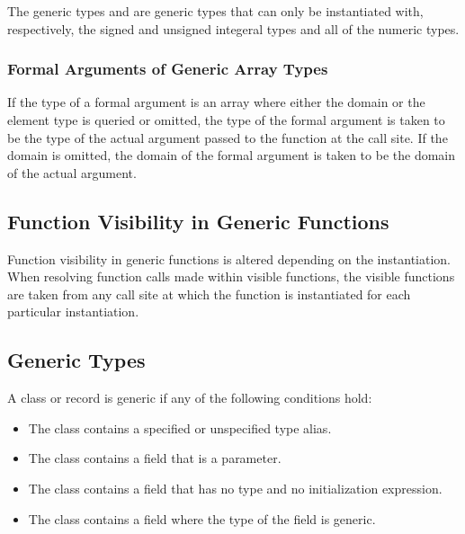 The generic types  and  are generic types
that can only be instantiated with, respectively, the signed and
unsigned integeral types and all of the numeric types.

\subsubsection{Formal Arguments of Generic Array Types}
\label{Formal_Arguments_of_Generic_Array_Types}

If the type of a formal argument is an array where either the domain
or the element type is queried or omitted, the type of the formal
argument is taken to be the type of the actual argument passed to the
function at the call site.  If the domain is omitted, the domain of
the formal argument is taken to be the domain of the actual argument.

\subsection{Function Visibility in Generic Functions}
\label{Function_Visibility_in_Generic_Functions}

Function visibility in generic functions is altered depending on the
instantiation.  When resolving function calls made within visible
functions, the visible functions are taken from any call site at which
the function is instantiated for each particular instantiation.

\subsection{Generic Types}
\label{Generic_Types}

A class or record is generic if any of the following conditions hold:
\begin{itemize}
\item
The class contains a specified or unspecified type alias.
\item
The class contains a field that is a parameter.
\item
The class contains a field that has no type and no initialization
expression.
\item
The class contains a field where the type of the field is generic.
\end{itemize}


